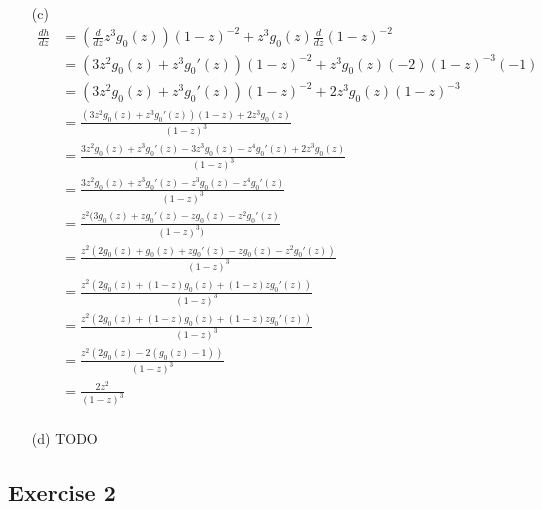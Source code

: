 \documentclass{article}
\begin{document}
\begin{enumerate}
  \item[(c)]
  \begin{align*}
    \frac{dh}{dz} &= \left( \frac{d}{dz} z^3 g_0(z) \right) (1 - z)^{-2} + z^3 g_0(z) \frac{d}{dz} (1 - z)^{-2} \\
    &= (3z^2 g_0(z) + z^3 g_0'(z)) (1 - z)^{-2} + z^3 g_0(z) (-2) (1 - z)^{-3} (-1) \\
    &= (3z^2 g_0(z) + z^3 g_0'(z)) (1 - z)^{-2} + 2z^3 g_0(z) (1 - z)^{-3} \\
    &= \frac{(3z^2 g_0(z) + z^3 g_0'(z))(1 - z) + 2z^3 g_0(z)}{(1 - z)^3} \\
    &= \frac{3z^2 g_0(z) + z^3 g_0'(z) - 3z^3 g_0(z) - z^4 g_0'(z) + 2z^3 g_0(z)}{(1 - z)^3} \\
    &= \frac{3z^2 g_0(z) + z^3 g_0'(z) - z^3 g_0(z) - z^4 g_0'(z)}{(1 - z)^3} \\
    &= \frac{z^2 (3g_0(z) + z g_0'(z) - z g_0(z) - z^2 g_0'(z)}{(1 - z)^3)} \\
    &= \frac{z^2 (2g_0(z) + g_0(z) + z g_0'(z) - z g_0(z) - z^2 g_0'(z))}{(1 - z)^3} \\
    &= \frac{z^2 (2g_0(z) + (1 - z) g_0(z) + (1 - z) z g_0'(z))}{(1 - z)^3} \\
    &= \frac{z^2 (2g_0(z) + (1 - z) g_0(z) + (1 - z) z g_0'(z))}{(1 - z)^3} \\
    &= \frac{z^2 (2g_0(z) - 2(g_0(z) - 1))}{(1 - z)^3} \\
    &= \frac{2z^2}{(1 - z)^3} \\
  \end{align*}

  \item[(d)]
  TODO
\end{enumerate}

\newpage

\subsection*{Exercise 2}
\end{document}
